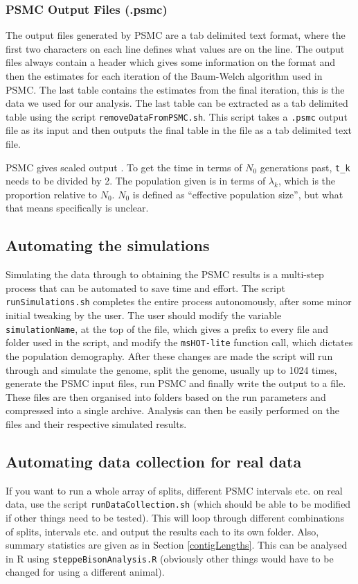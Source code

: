\documentclass[11pt,a4paper]{article}
\begin{document}
\subsubsection{PSMC Output Files (.psmc)}
The output files generated by PSMC are a tab delimited text format, where the first two characters on each line defines what values are on the line. The output files always contain a header which gives some information on the format and then the estimates for each iteration of the Baum-Welch algorithm used in PSMC. The last table contains the estimates from the final iteration, this is the data we used for our analysis. The last table can be extracted as a tab delimited table using the script \verb|removeDataFromPSMC.sh|. This script takes a \verb|.psmc| output file as its input and then outputs the final table in the file as a tab delimited text file.

PSMC gives scaled output \cite{li2011inference}. To get the time in terms of $N_0$ generations past, \verb|t_k| needs to be divided by 2. The population given is in terms of $\lambda_k$, which is the proportion relative to $N_0$. $N_0$ is defined as ``effective population size'', but what that means specifically is unclear.

\subsection{Automating the simulations}

Simulating the data through to obtaining the PSMC results is a multi-step process that can be automated to save time and effort. The script \verb|runSimulations.sh| completes the entire process autonomously, after some minor initial tweaking by the user. The user should modify the variable \verb|simulationName|, at the top of the file, which gives a prefix to every file and folder used in the script, and modify the \verb|msHOT-lite| function call, which dictates the population demography. After these changes are made the script will run through and simulate the genome, split the genome, usually up to 1024 times, generate the PSMC input files, run PSMC and finally write the output to a file. These files are then organised into folders based on the run parameters and compressed into a single archive. Analysis can then be easily performed on the files and their respective simulated results.

\subsection{Automating data collection for real data}
If you want to run a whole array of splits, different PSMC intervals etc. on real data, use the script \verb|runDataCollection.sh| (which should be able to be modified if other things need to be tested). This will loop through different combinations of splits, intervals etc. and output the results each to its own folder. Also, summary statistics are given as in Section \ref{contigLengths}. This can be analysed in R using \verb|steppeBisonAnalysis.R| (obviously other things would have to be changed for using a different animal).
\end{document}
